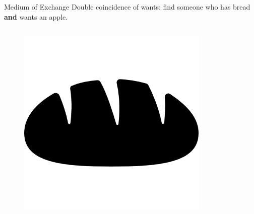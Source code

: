 \documentclass[]{beamer}
\begin{document}
\begin{frame}{Medium of Exchange}
	Double coincidence of wants: find someone who has bread \textcolor{focus}{\textbf{and}} wants an apple.
	\begin{columns}
		\begin{column}{0.5\textwidth}
			\begin{figure}
				\begin{center}
					\includegraphics[height = 0.1\textheight, rotate = 30]{../assets/images/bread}
				\end{center}
			\end{figure}
		\end{column}
		\begin{column}{0.5\textwidth}
			\begin{figure}
				\begin{center}

\end{center}
\end{figure}
\end{column}
\end{columns}
\end{frame}
\end{document}
